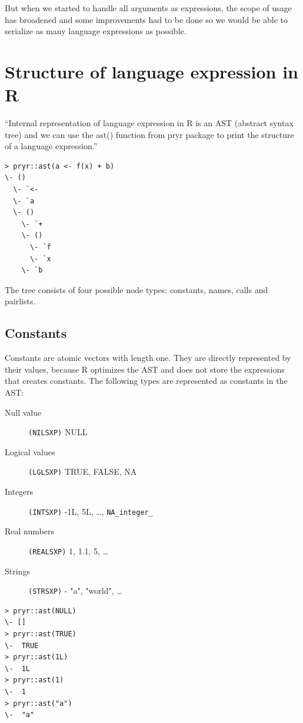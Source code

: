 \documentclass[thesis=B,english]{FITthesis}[2012/10/20]
\begin{document}
But when we started to handle all arguments as expressions, the scope of usage has broadened and some improvements had to be done so we would be able to serialize as many language expressions as possible.

\section{Structure of language expression in R}
``Internal representation of language expression in R is an AST (abstract syntax tree) and we can use the ast() function from pryr package to print the structure of a language expression.'' \cite{advR}

\begin{minipage}{\linewidth}
\begin{verbatim}
> pryr::ast(a <- f(x) + b)
\- ()
  \- `<-
  \- `a
  \- ()
    \- `+
    \- ()
      \- `f
      \- `x
    \- `b
\end{verbatim}
\end{minipage}

The tree consists of four possible node types: constants, names, calls and pairlists.

\subsection{Constants}
Constants are atomic vectors with length one. They are directly represented by their values, because R optimizes the AST and does not store the expressions that creates constants. The following types are represented as constants in the AST:

\begin{description}
	\item[Null value] \verb|(NILSXP)| NULL
	\item[Logical values] \verb|(LGLSXP)| TRUE, FALSE, NA
	\item[Integers] \verb|(INTSXP)| -1L, 5L, \ldots, \verb|NA_integer_|
	\item[Real numbers] \verb|(REALSXP)| 1, 1.1, 5, \ldots
	\item[Strings] \verb|(STRSXP)| - "a", "world", \ldots

\end{description}

\begin{verbatim}
> pryr::ast(NULL)
\- []
> pryr::ast(TRUE)
\-  TRUE
> pryr::ast(1L)
\-  1L
> pryr::ast(1)
\-  1
> pryr::ast("a")
\-  "a"
\end{verbatim}
\end{document}
